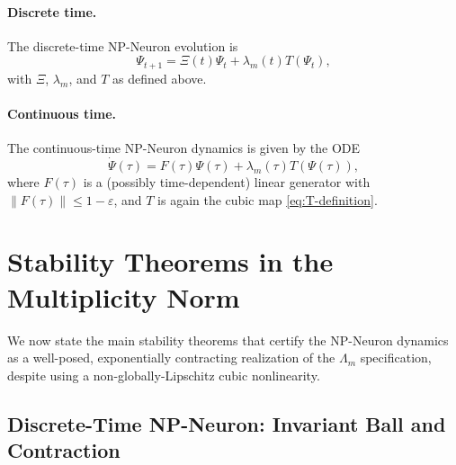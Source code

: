 \documentclass[11pt]{article}
\begin{document}
\paragraph{Discrete time.}
The discrete-time NP-Neuron evolution is
\begin{equation}
\label{eq:discrete-evolution}
\Psi_{t+1}
= \Xi(t)\Psi_t + \lambda_m(t)T(\Psi_t),
\end{equation}
with \(\Xi\), \(\lambda_m\), and \(T\) as defined above.

\paragraph{Continuous time.}
The continuous-time NP-Neuron dynamics is given by the ODE
\begin{equation}
\label{eq:continuous-evolution}
\dot{\Psi}(\tau)
= F(\tau)\Psi(\tau) + \lambda_m(\tau)T(\Psi(\tau)),
\end{equation}
where \(F(\tau)\) is a (possibly time-dependent) linear generator with \(\|F(\tau)\|\le 1-\varepsilon\), and \(T\) is again the cubic map \eqref{eq:T-definition}.

\section{Stability Theorems in the Multiplicity Norm}

We now state the main stability theorems that certify the NP-Neuron dynamics as a well-posed, exponentially contracting realization of the \(\Lambda_m\) specification, despite using a non-globally-Lipschitz cubic nonlinearity.

\subsection{Discrete-Time NP-Neuron: Invariant Ball and Contraction}
\end{document}

